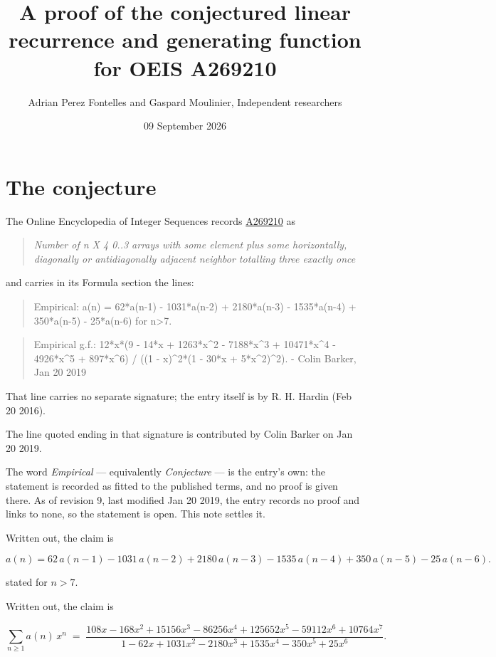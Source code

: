 \documentclass[11pt]{article}
\title{A proof of the conjectured linear recurrence and generating function for OEIS A269210}
\author{Adrian Perez Fontelles and Gaspard Moulinier, Independent researchers}
\date{09 September 2026}
\theoremstyle{definition}
\begin{document}
\maketitle
\section{The conjecture}

The Online Encyclopedia of Integer Sequences records \href{https://oeis.org/A269210}{A269210} as

\begin{quote}\itshape Number of n X 4 0..3 arrays with some element plus some horizontally, diagonally or antidiagonally adjacent neighbor totalling three exactly once\end{quote}

and carries in its Formula section the lines:

\begin{quote}\ttfamily Empirical: a(n) = 62*a(n-1) - 1031*a(n-2) + 2180*a(n-3) - 1535*a(n-4) + 350*a(n-5) - 25*a(n-6) for n>7.\end{quote}

\begin{quote}\ttfamily Empirical g.f.: 12*x*(9 - 14*x + 1263*x\textasciicircum{}2 - 7188*x\textasciicircum{}3 + 10471*x\textasciicircum{}4 - 4926*x\textasciicircum{}5 + 897*x\textasciicircum{}6) / ((1 - x)\textasciicircum{}2*(1 - 30*x + 5*x\textasciicircum{}2)\textasciicircum{}2). - Colin Barker, Jan 20 2019\end{quote}

That line carries no separate signature; the entry itself is by R. H. Hardin (Feb 20 2016).

The line quoted ending in that signature is contributed by Colin Barker on Jan 20 2019.

The word {\itshape Empirical} --- equivalently {\itshape Conjecture} --- is the entry's own: the statement is recorded as fitted to the published terms, and no proof is given there. As of revision 9, last modified Jan 20 2019, the entry records no proof and links to none, so the statement is open. This note settles it.

Written out, the claim is

\[a(n) = 62\,a(n-1) - 1031\,a(n-2) + 2180\,a(n-3) - 1535\,a(n-4) + 350\,a(n-5) - 25\,a(n-6).\]

stated for $n > 7$.

Written out, the claim is

\[\sum_{n \ge 1} a(n)\,x^n \;=\; \frac{108x - 168x^{2} + 15156x^{3} - 86256x^{4} + 125652x^{5} - 59112x^{6} + 10764x^{7}}{1 - 62x + 1031x^{2} - 2180x^{3} + 1535x^{4} - 350x^{5} + 25x^{6}}.\]
\end{document}
